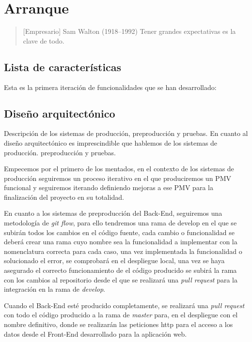 \chapter{Arranque}

\begin{quotation} [Empresario] {Sam Walton (1918--1992)}
Tener grandes expectativas es la clave de todo.
\end{quotation}

\begin{abstract}
Vamos a explicar el comienzo del proyecto, definiendo las características que dispondrá nuestra aplicación, así como el diseño arquitectónico definido.
\end{abstract}

\section{Lista de características}

Esta es la primera iteración de funcionalidades que se han desarrollado:
\section{Diseño arquitectónico}
\label{sec:arquitectura}
Descripción de los sistemas de producción, preproducción y pruebas.
En cuanto al diseño arquitectónico es imprescindible que hablemos de los sistemas de producción. preproducción y pruebas.

Empecemos por el primero de los mentados, en el contexto de los sistemas de producción seguiremos un proceso iterativo en el que produciremos un PMV funcional y seguiremos iterando definiendo mejoras a ese PMV para la finalización del proyecto en su totalidad.

En cuanto a los sistemas de preproducción del Back-End, seguiremos una metodología de \emph{git flow}, para ello tendremos una rama de develop en el que se subirán todos los cambios en el código fuente, cada cambio o funcionalidad se deberá crear una rama cuyo nombre sea la funcionalidad a implementar con la nomenclatura correcta para cada caso, una vez implementada la funcionalidad o solucionado el error, se comprobará en el despliegue local, una vez se haya asegurado el correcto funcionamiento de el código producido se subirá la rama con los cambios al repositorio desde el que se realizará una \emph{pull request} para la integración en la rama de \emph{develop}.

Cuando el Back-End esté producido completamente, se realizará una \emph{pull request} con todo el código producido a la rama de \emph{master} para, en el despliegue con el nombre definitivo, donde se realizarán las peticiones http para el acceso a los datos desde el Front-End desarrollado para la aplicación web.

